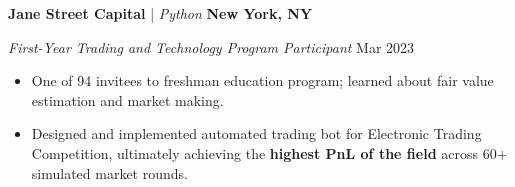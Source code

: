 \textbf{Jane Street Capital} | \textit{Python} \hfill \textbf{New York, NY}\par
\textit{First-Year Trading and Technology Program Participant} \hfill Mar 2023

\begin{itemize}
	\item One of 94 invitees to freshman education program; learned about fair value estimation and market making.
	\item Designed and implemented automated trading bot for Electronic Trading Competition, ultimately achieving the \textbf{highest PnL of the field} across 60+ simulated market rounds.
\end{itemize}\par